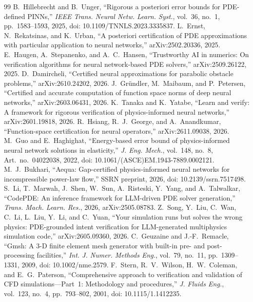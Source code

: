 \documentclass[11pt]{article}
\begin{document}
\begin{thebibliography}{99}
 B.~Hillebrecht and B.~Unger, ``Rigorous a posteriori error bounds for PDE-defined PINNs,'' \emph{IEEE Trans. Neural Netw. Learn. Syst.}, vol.~36, no.~1, pp.~1583--1593, 2025, doi: 10.1109/TNNLS.2023.3335837.
 L.~Ernst, N.~Rekatsinas, and K.~Urban, ``A posteriori certification of PDE approximations with particular application to neural networks,'' arXiv:2502.20336, 2025.
 E.~Haugen, A.~Stepanenko, and A.~C.~Hansen, ``Trustworthy AI in numerics: On verification algorithms for neural network-based PDE solvers,'' arXiv:2509.26122, 2025.
 D.~Damircheli, ``Certified neural approximations for parabolic obstacle problems,'' arXiv:2610.24202, 2026.
 J.~Gr\"undler, M.~Maibaum, and P.~Petersen, ``Certified and accurate computation of function space norms of deep neural networks,'' arXiv:2603.06431, 2026.
 K.~Tanaka and K.~Yatabe, ``Learn and verify: A framework for rigorous verification of physics-informed neural networks,'' arXiv:2601.19818, 2026.
 R.~Hsiang, R.~J.~George, and A.~Anandkumar, ``Function-space certification for neural operators,'' arXiv:2611.09038, 2026.
 M.~Guo and E.~Haghighat, ``Energy-based error bound of physics-informed neural network solutions in elasticity,'' \emph{J. Eng. Mech.}, vol.~148, no.~8, Art.~no.~04022038, 2022, doi: 10.1061/(ASCE)EM.1943-7889.0002121.
 M.~J.~Bukhari, ``Aequa: Gap-certified physics-informed neural networks for incompressible power-law flow,'' SSRN preprint, 2026, doi: 10.2139/ssrn.7517498.
 S.~Li, T.~Marwah, J.~Shen, W.~Sun, A.~Risteski, Y.~Yang, and A.~Talwalkar, ``CodePDE: An inference framework for LLM-driven PDE solver generation,'' \emph{Trans. Mach. Learn. Res.}, 2026, arXiv:2505.08783.
 Z.~Song, Y.~Liu, C.~Wan, C.~Li, L.~Liu, Y.~Li, and C.~Yuan, ``Your simulation runs but solves the wrong physics: PDE-grounded intent verification for LLM-generated multiphysics simulation code,'' arXiv:2605.09360, 2026.
 C.~Geuzaine and J.-F.~Remacle, ``Gmsh: A 3-D finite element mesh generator with built-in pre- and post-processing facilities,'' \emph{Int. J. Numer. Methods Eng.}, vol.~79, no.~11, pp.~1309--1331, 2009, doi: 10.1002/nme.2579.
 F.~Stern, R.~V.~Wilson, H.~W.~Coleman, and E.~G.~Paterson, ``Comprehensive approach to verification and validation of CFD simulations---Part~1: Methodology and procedures,'' \emph{J. Fluids Eng.}, vol.~123, no.~4, pp.~793--802, 2001, doi: 10.1115/1.1412235.

\end{thebibliography}
\end{document}
